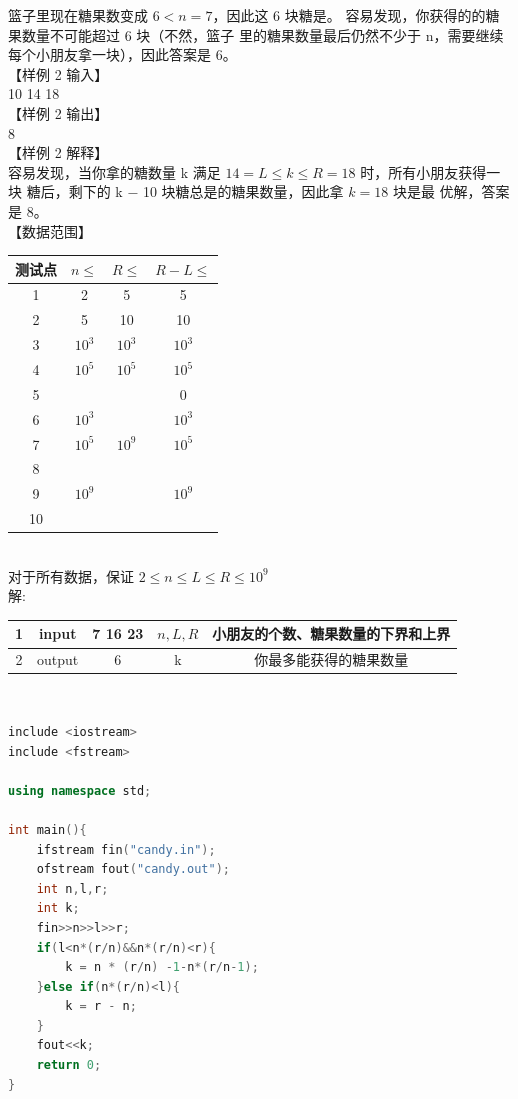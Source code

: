 \documentclass[12pt,twiside,a4paper]{ctexbook}
\numberwithin{chapter}{part}
\begin{document}
篮子里现在糖果数变成 $6 < n = 7$，因此这 6 块糖是。
容易发现，你获得的的糖果数量不可能超过 6 块（不然，篮子
里的糖果数量最后仍然不少于 n，需要继续每个小朋友拿一块），因此答案是 6。\\
【样例 2 输入】\\
10 14 18\\
【样例 2 输出】\\
8\\
【样例 2 解释】\\
容易发现，当你拿的糖数量 k 满足 $14 = L \leq k \leq R = 18$ 时，所有小朋友获得一块
糖后，剩下的 k − 10 块糖总是的糖果数量，因此拿 $k = 18$ 块是最
优解，答案是 8。\\
【数据范围】\\
\begin{tabular}{|c|c|c|c|}
  \hline
  测试点 &  $n\leq$ & $R\leq$ & $R-L\leq$\\
  \hline
  1 & 2 & 5 & 5\\
  \hline
  2 & 5 & 10 & 10\\
  \hline
  3 & $10^3$ & $10^3$ & $10^3$\\
  \hline
  4 & $10^5$ & $10^5$ & $10^5$\\
  \hline
  5 & & & 0\\
  \cline{1-1}
  \cline{4-1}
  6 & $10^3$ & & $10^3$\\
  \cline{1-1}
  \cline{2-1}
  \cline{4-1}
  7 & $10^5$ & $10^9$ & $10^5$\\
  \cline{1-1}
  \cline{2-1}
  \cline{4-1}
  8 & & & \\
  \cline{1-1}
  9 & $10^9$ & & $10^{9}$\\
  \cline{1-1}
  10 & & &\\
  \hline
\end{tabular}\\
对于所有数据，保证 $2 \leq n \leq L \leq R \leq 10^9$\\
解:\\
\begin{tabular}{|c|c|c|c|c|}
\hline
1 & input &7 16 23 & $n, L, R$ & 小朋友的个数、糖果数量的下界和上界\\
\hline
2 & output & 6 & k & 你最多能获得的糖果数量\\
\hline
\end{tabular}\\
\begin{lstlisting}[language=C++]
include <iostream>
include <fstream>

using namespace std;

int main(){
	ifstream fin("candy.in");
	ofstream fout("candy.out");
	int n,l,r;
	int k;
	fin>>n>>l>>r;
	if(l<n*(r/n)&&n*(r/n)<r){
		k = n * (r/n) -1-n*(r/n-1);
	}else if(n*(r/n)<l){
		k = r - n;
	}
	fout<<k;
	return 0;
}
\end{lstlisting}
\end{document}
